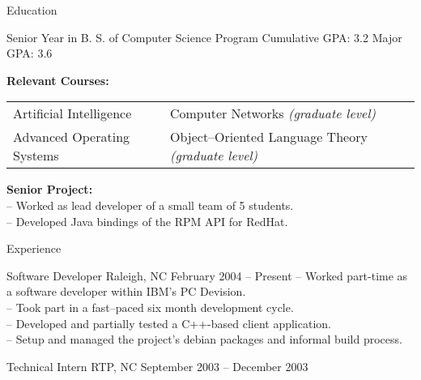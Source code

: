 \documentclass[letterpaper, 11pt]{article}
\begin{document}
    \begin{resume}
        \begin{category}{Education}
            \begin{block}
                 {Senior Year in B. S. of Computer Science Program}
                         {Cumulative GPA: 3.2}             {Major GPA: 3.6}
            \end{block}
            \begin{block}
                \textbf{Relevant Courses:}  \\
                \begin{tabular}{@{} l l @{}}
                    Artificial Intelligence         &   Computer Networks \emph{(graduate level)}               \\
                    Advanced Operating Systems      &   Object--Oriented Language Theory \emph{(graduate level)}    
                \end{tabular}
            \end{block}
            \begin{block}
                \textbf{Senior Project:}                                   \\
                -- Worked as lead developer of a small team of 5 students. \\
                -- Developed Java bindings of the RPM API for RedHat.
            \end{block}
        \end{category}
        \begin{category}{Experience}
            \begin{block}
                                      {Software Developer}
                         {Raleigh, NC}              {February 2004 -- Present}
                -- Worked part-time as a software developer within IBM's PC Devision.  \\
                -- Took part in a fast--paced six month development cycle.             \\
                -- Developed and partially tested a C++-based client application.      \\
                -- Setup and managed the project's debian packages and informal build process.
            \end{block}
            \begin{block}
                                      {Technical Intern}
                         {RTP, NC}                  {September 2003 -- December 2003}

\end{block}
\end{category}
\end{resume}
\end{document}
